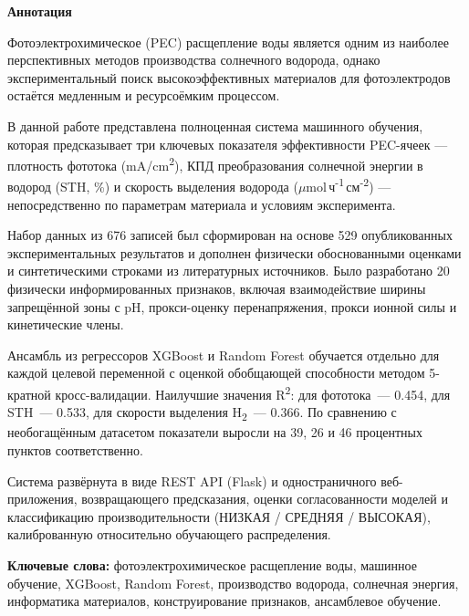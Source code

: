 \newpage
\pagestyle{plain}

{
\begin{center}
    \Large
    \textbf{Аннотация}
\end{center}

\vspace{0.5cm}

Фотоэлектрохимическое (PEC) расщепление воды является одним из наиболее перспективных
методов производства солнечного водорода, однако экспериментальный поиск
высокоэффективных материалов для фотоэлектродов остаётся медленным и ресурсоёмким
процессом.

В данной работе представлена полноценная система машинного обучения, которая предсказывает
три ключевых показателя эффективности PEC-ячеек --- плотность фототока (mA/cm\textsuperscript{2}),
КПД преобразования солнечной энергии в водород (STH, \%) и скорость выделения водорода
($\mu$mol\,ч\textsuperscript{-1}\,см\textsuperscript{-2}) --- непосредственно по параметрам
материала и условиям эксперимента.

Набор данных из 676 записей был сформирован на основе 529 опубликованных
экспериментальных результатов и дополнен физически обоснованными оценками и
синтетическими строками из литературных источников. Было разработано 20
физически информированных признаков, включая взаимодействие ширины запрещённой
зоны с pH, прокси-оценку перенапряжения, прокси ионной силы и кинетические члены.

Ансамбль из регрессоров XGBoost и Random Forest обучается отдельно для каждой целевой
переменной с оценкой обобщающей способности методом 5-кратной кросс-валидации.
Наилучшие значения R\textsuperscript{2}: для фототока~--- 0.454, для STH~--- 0.533,
для скорости выделения H\textsubscript{2}~--- 0.366.
По сравнению с необогащённым датасетом показатели выросли на 39, 26 и 46
процентных пунктов соответственно.

Система развёрнута в виде REST API (Flask) и одностраничного веб-приложения,
возвращающего предсказания, оценки согласованности моделей и
классификацию производительности (НИЗКАЯ / СРЕДНЯЯ / ВЫСОКАЯ),
калиброванную относительно обучающего распределения.

\vspace{0.5cm}
\noindent\textbf{Ключевые слова:} фотоэлектрохимическое расщепление воды,
машинное обучение, XGBoost, Random Forest, производство водорода, солнечная энергия,
информатика материалов, конструирование признаков, ансамблевое обучение.
}
